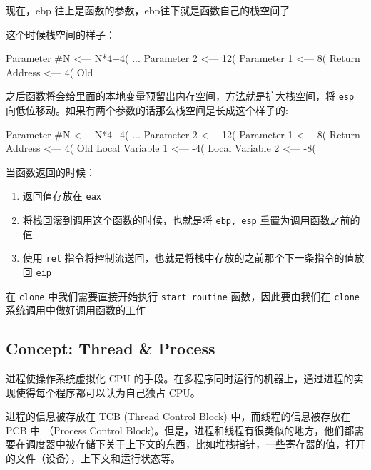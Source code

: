 现在，ebp 往上是函数的参数，ebp往下就是函数自己的栈空间了

这个时候栈空间的样子：

\begin{textcode}
    Parameter #N <--- N*4+4(%
    ...
    Parameter 2 <--- 12(%
    Parameter 1 <--- 8(%
    Return Address <--- 4(%
    Old %
\end{textcode}


之后函数将会给里面的本地变量预留出内存空间，方法就是扩大栈空间，将 \texttt{esp} 向低位移动。如果有两个参数的话那么栈空间是长成这个样子的:


\begin{textcode}
    Parameter #N <--- N*4+4(%
    ...
    Parameter 2 <--- 12(%
    Parameter 1 <--- 8(%
    Return Address <--- 4(%
    Old %
    Local Variable 1 <--- -4(%
    Local Variable 2 <--- -8(%
\end{textcode}

当函数返回的时候：

\begin{enumerate}
    \item 返回值存放在 \texttt{eax}
    \item 将栈回滚到调用这个函数的时候，也就是将 \texttt{ebp, esp} 重置为调用函数之前的值
    \item 使用 \texttt{ret} 指令将控制流送回，也就是将栈中存放的之前那个下一条指令的值放回 \texttt{eip}
\end{enumerate}

在 \texttt{clone} 中我们需要直接开始执行 \texttt{start\_routine} 函数，因此要由我们在 \texttt{clone} 系统调用中做好调用函数的工作


\subsection{Concept: Thread \&  Process}

进程使操作系统虚拟化 CPU 的手段。在多程序同时运行的机器上，通过进程的实现使得每个程序都可以认为自己独占 CPU。

进程的信息被存放在 TCB (Thread Control Block) 中，而线程的信息被存放在 PCB 中 （Process Control Block)。但是，进程和线程有很类似的地方，他们都需要在调度器中被存储下关于上下文的东西，比如堆栈指针，一些寄存器的值，打开的文件（设备），上下文和运行状态等。

